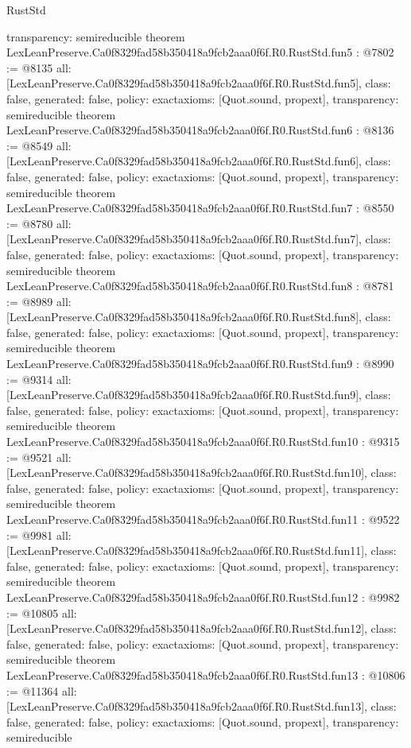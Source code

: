 \begin{lexlean}{RustStd}
\begin{coremodule}
{  transparency: semireducible
}
theorem LexLeanPreserve.Ca0f8329fad58b350418a9fcb2aaa0f6f.R0.RustStd.fun5 : @7802 := @8135 {
  all: [LexLeanPreserve.Ca0f8329fad58b350418a9fcb2aaa0f6f.R0.RustStd.fun5],
  class: false,
  generated: false,
  policy: exact{axioms: [Quot.sound, propext]},
  transparency: semireducible
}
theorem LexLeanPreserve.Ca0f8329fad58b350418a9fcb2aaa0f6f.R0.RustStd.fun6 : @8136 := @8549 {
  all: [LexLeanPreserve.Ca0f8329fad58b350418a9fcb2aaa0f6f.R0.RustStd.fun6],
  class: false,
  generated: false,
  policy: exact{axioms: [Quot.sound, propext]},
  transparency: semireducible
}
theorem LexLeanPreserve.Ca0f8329fad58b350418a9fcb2aaa0f6f.R0.RustStd.fun7 : @8550 := @8780 {
  all: [LexLeanPreserve.Ca0f8329fad58b350418a9fcb2aaa0f6f.R0.RustStd.fun7],
  class: false,
  generated: false,
  policy: exact{axioms: [Quot.sound, propext]},
  transparency: semireducible
}
theorem LexLeanPreserve.Ca0f8329fad58b350418a9fcb2aaa0f6f.R0.RustStd.fun8 : @8781 := @8989 {
  all: [LexLeanPreserve.Ca0f8329fad58b350418a9fcb2aaa0f6f.R0.RustStd.fun8],
  class: false,
  generated: false,
  policy: exact{axioms: [Quot.sound, propext]},
  transparency: semireducible
}
theorem LexLeanPreserve.Ca0f8329fad58b350418a9fcb2aaa0f6f.R0.RustStd.fun9 : @8990 := @9314 {
  all: [LexLeanPreserve.Ca0f8329fad58b350418a9fcb2aaa0f6f.R0.RustStd.fun9],
  class: false,
  generated: false,
  policy: exact{axioms: [Quot.sound, propext]},
  transparency: semireducible
}
theorem LexLeanPreserve.Ca0f8329fad58b350418a9fcb2aaa0f6f.R0.RustStd.fun10 : @9315 := @9521 {
  all: [LexLeanPreserve.Ca0f8329fad58b350418a9fcb2aaa0f6f.R0.RustStd.fun10],
  class: false,
  generated: false,
  policy: exact{axioms: [Quot.sound, propext]},
  transparency: semireducible
}
theorem LexLeanPreserve.Ca0f8329fad58b350418a9fcb2aaa0f6f.R0.RustStd.fun11 : @9522 := @9981 {
  all: [LexLeanPreserve.Ca0f8329fad58b350418a9fcb2aaa0f6f.R0.RustStd.fun11],
  class: false,
  generated: false,
  policy: exact{axioms: [Quot.sound, propext]},
  transparency: semireducible
}
theorem LexLeanPreserve.Ca0f8329fad58b350418a9fcb2aaa0f6f.R0.RustStd.fun12 : @9982 := @10805 {
  all: [LexLeanPreserve.Ca0f8329fad58b350418a9fcb2aaa0f6f.R0.RustStd.fun12],
  class: false,
  generated: false,
  policy: exact{axioms: [Quot.sound, propext]},
  transparency: semireducible
}
theorem LexLeanPreserve.Ca0f8329fad58b350418a9fcb2aaa0f6f.R0.RustStd.fun13 : @10806 := @11364 {
  all: [LexLeanPreserve.Ca0f8329fad58b350418a9fcb2aaa0f6f.R0.RustStd.fun13],
  class: false,
  generated: false,
  policy: exact{axioms: [Quot.sound, propext]},
  transparency: semireducible
}
\end{coremodule}
\end{lexlean}

